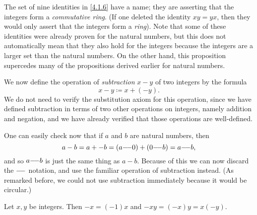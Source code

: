 \begin{rmk}\label{4.1.7}
  The set of nine identities in \cref{4.1.6} have a name;
  they are asserting that the integers form a \emph{commutative ring}.
  (If one deleted the identity \(xy = yx\), then they would only assert that the integers form a \emph{ring}).
  Note that some of these identities were already proven for the natural numbers, but this does not automatically mean that they also hold for the integers because the integers are a larger set than the natural numbers.
  On the other hand, this proposition supercedes many of the propositions derived earlier for natural numbers.
\end{rmk}

\begin{ac}\label{ac:4.1.4}
  We now define the operation of \emph{subtraction} \(x - y\) of two integers by the formula
  \[
    x - y \coloneqq x + (-y).
  \]
  We do not need to verify the substitution axiom for this operation, since we have defined subtraction in terms of two other operations on integers, namely addition and negation, and we have already verified that those operations are well-defined.

  One can easily check now that if \(a\) and \(b\) are natural numbers, then
  \[
    a - b = a + -b = (a {-}\!{-} 0) + (0 {-}\!{-} b) = a {-}\!{-} b,
  \]
  and so \(a {-}\!{-} b\) is just the same thing as \(a - b\).
  Because of this we can now discard the \({-}\!{-}\) notation, and use the familiar operation of subtraction instead.
  (As remarked before, we could not use subtraction immediately because it would be circular.)
\end{ac}

\begin{ac}\label{ac:4.1.5}
  Let \(x, y\) be integers.
  Then \(-x = (-1) x\) and \(-xy = (-x) y = x (-y)\).
\end{ac}

